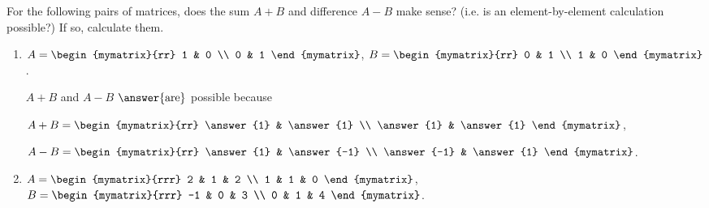 \documentclass{ximera}
\begin{document}
\begin{problem}
  For the following pairs of matrices, does the sum $A+B$ and difference $A-B$ make sense? (i.e. is an element-by-element calculation possible?) If so, calculate them.
  \begin{enumerate}
  \item
    $A = \begin{mymatrix}{rr}
      1 & 0 \\
      0 & 1
    \end{mymatrix}$,\quad
    $B = \begin{mymatrix}{rr}
      0 & 1 \\
      1 & 0
    \end{mymatrix}$.

    \begin{sol}
    

      $A+B$ and $A-B$ $\answer{\text{are}}$ possible because 

      \begin{selectAll}
      \end{selectAll}

      $A+B = \begin{mymatrix}{rr}
        \answer{1} & \answer{1} \\
        \answer{1} & \answer{1}
      \end{mymatrix}$,\quad

      $A-B = \begin{mymatrix}{rr}
        \answer{1} & \answer{-1} \\
        \answer{-1} & \answer{1}
      \end{mymatrix}$.


    \end{sol}

  \item
    $A = \begin{mymatrix}{rrr}
      2 & 1 & 2 \\
      1 & 1 & 0
    \end{mymatrix}$,\quad
    $B = \begin{mymatrix}{rrr}
      -1 & 0 & 3 \\
      0 & 1 & 4
    \end{mymatrix}$.


\end{enumerate}
\end{problem}
\end{document}
